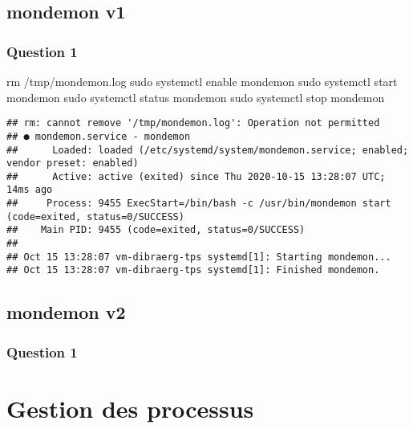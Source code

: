 \documentclass[]{article}
\newenvironment{Shaded}{}{}
\newcommand{\FunctionTok}[1]{\textcolor[rgb]{0.02,0.16,0.49}{#1}}
\newcommand{\NormalTok}[1]{#1}
\begin{document}
\hypertarget{mondemon-v1}{%
\subsection{mondemon v1}\label{mondemon-v1}}

\hypertarget{question-1-3}{%
\subsubsection{Question 1}\label{question-1-3}}

\begin{Shaded}
\begin{Highlighting}[]
\FunctionTok{rm}\NormalTok{ /tmp/mondemon.log}
\FunctionTok{sudo}\NormalTok{ systemctl enable mondemon}
\FunctionTok{sudo}\NormalTok{ systemctl start mondemon}
\FunctionTok{sudo}\NormalTok{ systemctl status mondemon}
\FunctionTok{sudo}\NormalTok{ systemctl stop mondemon}
\end{Highlighting}
\end{Shaded}

\begin{verbatim}
## rm: cannot remove '/tmp/mondemon.log': Operation not permitted
## ● mondemon.service - mondemon
##      Loaded: loaded (/etc/systemd/system/mondemon.service; enabled; vendor preset: enabled)
##      Active: active (exited) since Thu 2020-10-15 13:28:07 UTC; 14ms ago
##     Process: 9455 ExecStart=/bin/bash -c /usr/bin/mondemon start (code=exited, status=0/SUCCESS)
##    Main PID: 9455 (code=exited, status=0/SUCCESS)
## 
## Oct 15 13:28:07 vm-dibraerg-tps systemd[1]: Starting mondemon...
## Oct 15 13:28:07 vm-dibraerg-tps systemd[1]: Finished mondemon.
\end{verbatim}

\hypertarget{mondemon-v2}{%
\subsection{mondemon v2}\label{mondemon-v2}}

\hypertarget{question-1-4}{%
\subsubsection{Question 1}\label{question-1-4}}

\hypertarget{gestion-des-processus}{%
\section{Gestion des processus}\label{gestion-des-processus}}
\end{document}
